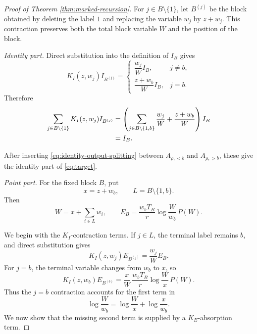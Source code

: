 \documentclass[letterpaper,12pt]{amsart}
\theoremstyle{definition}
\numberwithin{equation}{section}
\begin{document}
\begin{proof}[Proof of Theorem \ref{thm:marked-recursion}]
For \(j\in B\setminus\{1\}\), let \(B^{(j)}\) be the block obtained by deleting
the label \(1\) and replacing the variable \(w_j\) by \(z+w_j\).  This
contraction preserves both the total block variable \(W\) and the 
position of the block.

\smallskip
\noindent\emph{Identity part.}
Direct substitution into the definition of \(I_B\) gives
\[
  K_I(z,w_j)I_{B^{(j)}}
  =
  \begin{cases}
    \dfrac{w_j}{W}I_B, & j\ne b,\\[6pt]
    \dfrac{z+w_b}{W}I_B, & j=b.
  \end{cases}
\]
Therefore
\begin{align}
  \sum_{j\in B\setminus\{1\}}
  K_I(z,w_j)I_{B^{(j)}}
  &=
  \left(
    \sum_{\substack{j\in B\setminus\{1,b\}}}\frac{w_j}{W}
    +\frac{z+w_b}{W}
  \right)I_B
  \notag\\
  &=I_B. 
  \label{eq:identity-output-splitting}
\end{align} 

After inserting \eqref{eq:identity-output-splitting} between
\(A_{\rho,<b}\) and \(A_{\rho,>b}\), these give the identity part of 
\eqref{eq:target}.

\smallskip
\noindent\emph{Point part.}
For the fixed block \(B\), put
\[
  x=z+w_b,
  \qquad
  L=B\setminus\{1,b\}.
\]
Then
\begin{equation}
  W=x+\sum_{i\in L}w_i,
  \qquad
  E_B
  =
  \frac{w_bT_B}{r}\log\frac{W}{w_b}\,P(W).
  \label{eq:fixed-point-block}
\end{equation}

We begin with the \(K_I\)-contraction terms.  If \(j\in L\), the terminal
label remains \(b\), and direct substitution gives
\begin{equation}
  K_I(z,w_j)E_{B^{(j)}}
  =
  \frac{w_j}{W}E_B.
  \label{eq:nonterminal-point-contraction}
\end{equation}
For \(j=b\), the terminal variable changes from \(w_b\) to \(x\), so
\begin{equation}
  K_I(z,w_b)E_{B^{(b)}}
  =
  \frac xW\,\frac{w_bT_B}r
  \log\frac{W}{x}\,P(W).
  \label{eq:terminal-KI}
\end{equation}
Thus the \(j=b\) contraction accounts for the first term in
\begin{equation}
  \log\frac{W}{w_b}
  =
  \log\frac{W}{x}
  +
  \log\frac{x}{w_b}.
  \label{eq:log-split}
\end{equation}
 We now show that the
missing second term is supplied by a \(K_E\)-absorption term.


\end{proof}
\end{document}

